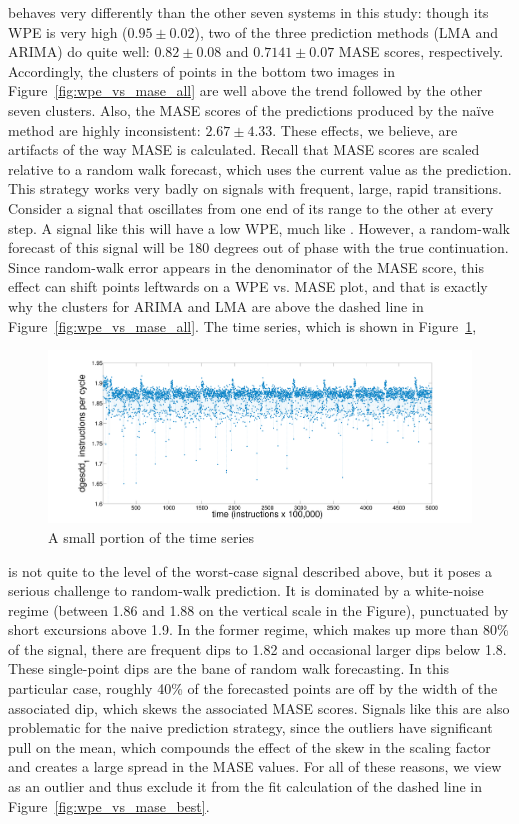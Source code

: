 \svdone behaves very differently than the other seven systems in this
study: though its WPE is very high ($0.95 \pm 0.02$), two of the three
prediction methods (LMA and ARIMA) do quite well: $0.82 \pm 0.08$ and
$0.7141 \pm 0.07$ MASE scores, respectively.  Accordingly, the
clusters of \svdone points in the bottom two images in
Figure~\ref{fig:wpe_vs_mase_all} are well above the trend followed by
the other seven clusters.  Also, the MASE scores of the predictions
produced by the na\"ive method are highly inconsistent: $2.67 \pm
4.33$.  These effects, we believe, are artifacts of the way MASE is
calculated.  Recall that MASE scores are scaled relative to a random
walk forecast, which uses the current value as the prediction.  This
strategy works very badly on signals with frequent, large, rapid
transitions.  Consider a signal that oscillates from one end of its
range to the other at every step.  A signal like this will have a low
WPE, much like \col.  However, a random-walk forecast of this signal
will be 180 degrees out of phase with the true continuation.  Since
random-walk error appears in the denominator of the MASE score, this
effect can shift points leftwards on a WPE vs. MASE plot, and that is
exactly why the \svdone clusters for ARIMA and LMA are above the
dashed line in Figure~\ref{fig:wpe_vs_mase_all}.  The \svdone time
series, which is shown in Figure~\ref{fig:svdone-ts},
\begin{figure}[htbp]
  \centering
    \includegraphics[width=\textwidth]{figs/svdonets2}
\caption{A small portion of the \svdone time series}\label{fig:svdone-ts}
\end{figure} 
is not quite to the level of the worst-case signal described above,
but it poses a serious challenge to random-walk prediction.  It is
dominated by a white-noise regime (between 1.86 and 1.88 on the
vertical scale in the Figure), punctuated by short excursions above
1.9.  In the former regime, which makes up more than 80\% of the
signal, there are frequent dips to 1.82 and occasional larger dips
below 1.8.  These single-point dips are the bane of random walk
forecasting.  In this particular case, roughly 40\% of the forecasted
points are off by the width of the associated dip, which skews the
associated MASE scores.  Signals like this are also problematic for
the naive prediction strategy, since the outliers have significant
pull on the mean, which compounds the effect of the skew in the
scaling factor and creates a large spread in the \svdone MASE values.
For all of these reasons, we view \svdone as an outlier and thus
exclude it from the fit calculation of the dashed line in
Figure~\ref{fig:wpe_vs_mase_best}.

